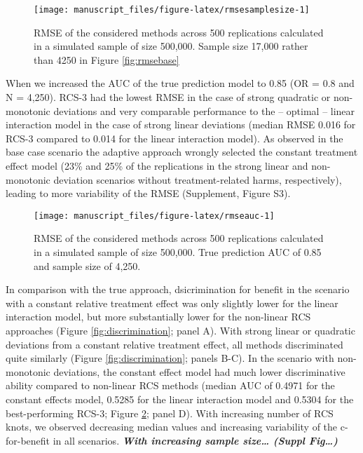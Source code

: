 \documentclass[]{elsarticle} %
\begin{document}
\begin{figure}
\texttt{[image: manuscript\_files/figure-latex/rmsesamplesize-1]} \caption{RMSE of the considered methods across 500 replications calculated in a simulated sample of size 500,000. Sample size 17,000 rather than 4250 in Figure \ref{fig:rmsebase}}\label{fig:rmsesamplesize}
\end{figure}

When we increased the AUC of the true prediction model to 0.85 (OR = 0.8
and N = 4,250). RCS-3 had the lowest RMSE in the case of strong
quadratic or non-monotonic deviations and very comparable performance to
the -- optimal -- linear interaction model in the case of strong linear
deviations (median RMSE 0.016 for RCS-3 compared to 0.014 for the linear
interaction model). As observed in the base case scenario the adaptive
approach wrongly selected the constant treatment effect model (23\% and
25\% of the replications in the strong linear and non-monotonic
deviation scenarios without treatment-related harms, respectively),
leading to more variability of the RMSE (Supplement, Figure S3).

\begin{figure}
\texttt{[image: manuscript\_files/figure-latex/rmseauc-1]} \caption{RMSE of the considered methods across 500 replications calculated in a simulated sample of size 500,000. True prediction AUC of 0.85 and sample size of 4,250.}\label{fig:rmseauc}
\end{figure}

In comparison with the true approach, dsicrimination for benefit in the
scenario with a constant relative treatment effect was only slightly
lower for the linear interaction model, but more substantially lower for
the non-linear RCS approaches (Figure \ref{fig:discrimination}; panel
A). With strong linear or quadratic deviations from a constant relative
treatment effect, all methods discriminated quite similarly (Figure
\ref{fig:discrimination}; panels B-C). In the scenario with
non-monotonic deviations, the constant effect model had much lower
discriminative ability compared to non-linear RCS methods (median AUC of
0.4971 for the constant effects model, 0.5285 for the linear interaction
model and 0.5304 for the best-performing RCS-3; Figure
\ref{fig:rmseauc}; panel D). With increasing number of RCS knots, we
observed decreasing median values and increasing variability of the
c-for-benefit in all scenarios. \textbf{\emph{With increasing sample
size\ldots{} (Suppl Fig\ldots)}}
\end{document}
